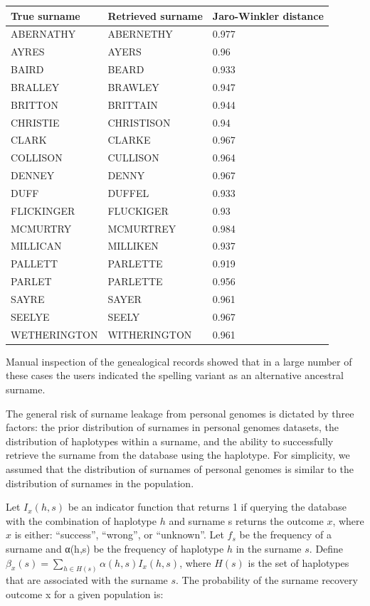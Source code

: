 \begin{table}[h!]
\begin{tabular}{|l|l|l|}
\hline
True surname & Retrieved surname & Jaro-Winkler distance \\
\hline
ABERNATHY    & ABERNETHY    & 0.977 \\
AYRES        & AYERS        & 0.96  \\
BAIRD        & BEARD        & 0.933 \\
BRALLEY      & BRAWLEY      & 0.947 \\
BRITTON      & BRITTAIN     & 0.944 \\
CHRISTIE     & CHRISTISON   & 0.94  \\
CLARK        & CLARKE       & 0.967 \\
COLLISON     & CULLISON     & 0.964 \\
DENNEY       & DENNY        & 0.967 \\
DUFF         & DUFFEL       & 0.933 \\
FLICKINGER   & FLUCKIGER    & 0.93  \\
MCMURTRY     & MCMURTREY    & 0.984 \\
MILLICAN     & MILLIKEN     & 0.937 \\
PALLETT      & PARLETTE     & 0.919 \\
PARLET       & PARLETTE     & 0.956 \\
SAYRE        & SAYER        & 0.961 \\
SEELYE       & SEELY        & 0.967 \\
WETHERINGTON & WITHERINGTON & 0.961 \\
\hline
\end{tabular}
\end{table}

Manual inspection of the genealogical records showed that in a large number of these cases the users indicated the spelling variant as an alternative ancestral surname.

The general risk of surname leakage from personal genomes is dictated by three factors: the prior distribution of surnames in personal genomes datasets, the distribution of haplotypes within a surname, and the ability to successfully retrieve the surname from the database using the haplotype. For simplicity, we assumed that the distribution of surnames of personal genomes is similar to the distribution of surnames in the population. 

Let $I_x(h,s)$ be an indicator function that returns 1 if querying the database with the combination of haplotype $h$ and surname s returns the outcome $x$, where $x$ is either: ``success'', ``wrong'', or ``unknown''. Let $f_s$ be the frequency of a surname and α(h,s) be the frequency of haplotype $h$ in the surname $s$. Define $\beta_x(s) = \sum_{h \in H(s)} \alpha(h,s)I_x(h,s)$, where $H(s)$ is the set of haplotypes that are associated with the surname $s$. The probability of the surname recovery outcome x for a given population is:

